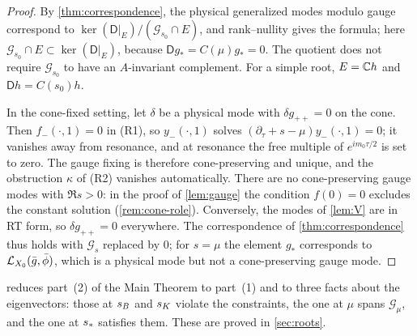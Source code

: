 \begin{proof}
By \cref{thm:correspondence}, the physical generalized modes modulo gauge correspond to
$\ker(\mathsf D|_E)/(\mathcal G_{s_0}\cap E)$, and rank--nullity gives the formula; here $\mathcal G_{s_0}\cap E\subset\ker(\mathsf D|_E)$,
because $\mathsf Dg_*=C(\mu)g_*=0$. The quotient does not
require $\mathcal G_{s_0}$ to have an $A$-invariant complement. For a simple root, $E=\mathbb{C} h$ and
$\mathsf Dh=C(s_0)h$.

In the cone-fixed setting, let $\delta$ be a physical mode with $\delta g_{++}=0$ on the cone. Then
$f_-(\cdot,1)=0$ in (R1), so $y_-(\cdot,1)$ solves $(\partial_\tau+s-\mu)y_-(\cdot,1)=0$; it vanishes away from
resonance, and at resonance the free multiple of $e^{im_0\tau/2}$ is set to zero. The gauge fixing is
therefore cone-preserving and unique, and the obstruction $\kappa$ of (R2) vanishes automatically. There
are no cone-preserving gauge modes with $\Re s>0$: in the proof of \cref{lem:gauge} the condition
$f(0)=0$ excludes the constant solution (\cref{rem:cone-role}). Conversely, the modes of \cref{lem:V} are in
RT form, so $\delta g_{++}=0$ everywhere. The correspondence of \cref{thm:correspondence} thus holds with
$\mathcal G_s$ replaced by $0$; for $s=\mu$ the element $g_*$ corresponds to $\mathcal{L}_{X_0}(\bar g,\bar\phi)$,
which is a physical mode but not a cone-preserving gauge mode.
\end{proof}

 reduces part~(2) of the Main Theorem to part~(1) and to three facts about the
eigenvectors: those at $s_{B}$ and $s_{K}$ violate the constraints, the one at $\mu$ spans $\mathcal G_\mu$, and the
one at $s_{\ast}$ satisfies them. These are proved in \cref{sec:roots}.

